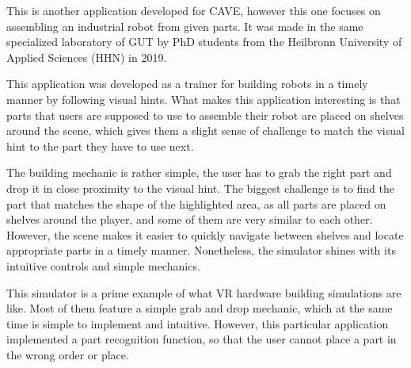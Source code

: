 This is another application developed for CAVE, however this one focuses on assembling an industrial robot from given parts.
It was made in the same specialized laboratory of GUT by PhD students from the Heilbronn University of Applied Sciences (HHN) in 2019.

This application was developed as a trainer for building robots in a timely manner by following visual hints.
What makes this application interesting is that parts that users are supposed to use to assemble their robot are placed on shelves around the scene, which gives them a slight sense of challenge to match the visual hint to the part they have to use next.

The building mechanic is rather simple, the user has to grab the right part and drop it in close proximity to the visual hint.
The biggest challenge is to find the part that matches the shape of the highlighted area, as all parts are placed on shelves around the player, and some of them are very similar to each other.
However, the scene makes it easier to quickly navigate between shelves and locate appropriate parts in a timely manner.
Nonetheless, the simulator shines with its intuitive controls and simple mechanics.

This simulator is a prime example of what VR hardware building simulations are like.
Most of them feature a simple grab and drop mechanic, which at the same time is simple to implement and intuitive.
However, this particular application implemented a part recognition function, so that the user cannot place a part in the wrong order or place.

